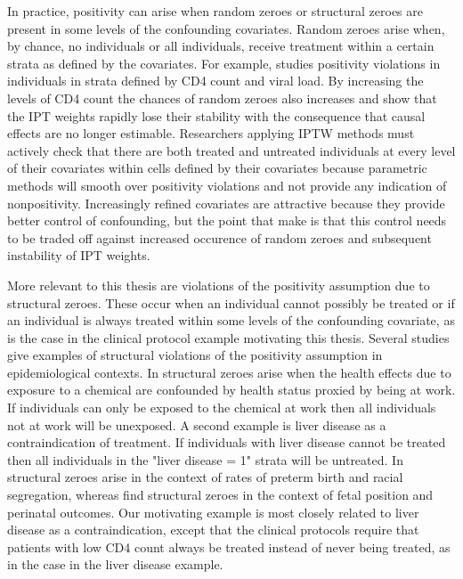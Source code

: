 \documentclass[11pt]{article}
\begin{document}
In practice, positivity can arise when random zeroes or structural
zeroes are present in some levels of the confounding covariates. Random
zeroes arise when, by chance, no individuals or all individuals, receive
treatment within a certain strata as defined by the covariates. For
example, \citet{Cole2008} studies positivity violations in individuals
in strata defined by CD4 count and viral load. By increasing the levels
of CD4 count the chances of random zeroes also increases and
\citet{Cole2008} show that the IPT weights rapidly lose their stability
with the consequence that causal effects are no longer estimable.
Researchers applying IPTW methods must actively check that there are
both treated and untreated individuals at every level of their
covariates within cells defined by their covariates because parametric
methods will smooth over positivity violations and not provide any
indication of nonpositivity. Increasingly refined covariates are
attractive because they provide better control of confounding, but the
point that \citet{Cole2008} make is that this control needs to be traded
off against increased occurence of random zeroes and subsequent
instability of IPT weights.

More relevant to this thesis are violations of the positivity assumption
due to structural zeroes. These occur when an individual cannot possibly
be treated or if an individual is always treated within some levels of
the confounding covariate, as is the case in the clinical protocol
example motivating this thesis. Several studies give examples of
structural violations of the positivity assumption in epidemiological
contexts. In \citet{Cole2008} structural zeroes arise when the health
effects due to exposure to a chemical are confounded by health status
proxied by being at work. If individuals can only be exposed to the
chemical at work then all individuals not at work will be unexposed. A
second example is liver disease as a contraindication of treatment. If
individuals with liver disease cannot be treated then all individuals in
the "liver disease = 1" strata will be untreated. In \citet{Messer2010}
structural zeroes arise in the context of rates of preterm birth and
racial segregation, whereas \citet{Cheng2010} find structural zeroes in
the context of fetal position and perinatal outcomes. Our motivating
example is most closely related to liver disease as a contraindication,
except that the clinical protocols require that patients with low CD4
count always be treated instead of never being treated, as in the case
in the liver disease example.
\end{document}
